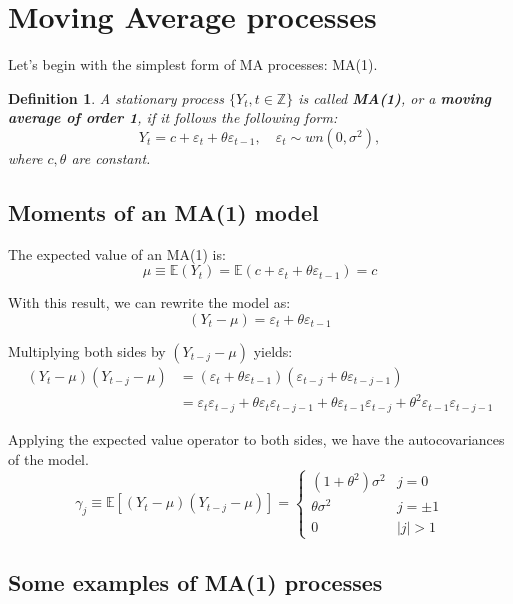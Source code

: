 \documentclass[11pt, a4paper]{report}
\theoremstyle{plain}
\theoremstyle{plain}
\newtheorem{defn}{Definition}[section]
\theoremstyle{remark}
\begin{document}
\section{Moving Average processes}

Let's begin with the simplest form of MA processes: MA(1). 
\begin{defn} \label{ma1-def}
	A stationary process $\{Y_t, t \in \mathbb{Z} \}$ is called \textbf{MA(1)}, or a \textbf{moving average of order 1}, if it follows the following form:
	$$ Y_t = c + \varepsilon_t + \theta \varepsilon_{t-1}, \hspace{1em} \varepsilon_t \sim wn(0, \sigma^2), $$
	where $c, \theta$ are constant.
\end{defn}

\subsection{Moments of an MA(1) model}

The expected value of an MA(1) is:
$$
\mu \equiv \mathbb{E}\left(Y_{t}\right)=\mathbb{E}\left(c+\varepsilon_{t}+\theta \varepsilon_{t-1}\right)=c
$$

With this result, we can rewrite the model as: 
$$
\left(Y_{t}-\mu\right)=\varepsilon_{t}+\theta \varepsilon_{t-1}
$$

Multiplying both sides by $\left(Y_{t-j}-\mu\right)$ yields:
$$
\begin{aligned}
	\left(Y_{t}-\mu\right)\left(Y_{t-j}-\mu\right) &=\left(\varepsilon_{t}+\theta \varepsilon_{t-1}\right)\left(\varepsilon_{t-j}+\theta \varepsilon_{t-j-1}\right) \\
	&=\varepsilon_{t} \varepsilon_{t-j}+\theta \varepsilon_{t} \varepsilon_{t-j-1}+\theta \varepsilon_{t-1} \varepsilon_{t-j}+\theta^{2} \varepsilon_{t-1} \varepsilon_{t-j-1}
\end{aligned}
$$

Applying the expected value operator to both sides, we have the autocovariances of the model.
$$
\gamma_{j} \equiv \mathbb{E}\left[\left(Y_{t}-\mu\right)\left(Y_{t-j}-\mu\right)\right]=\left\{\begin{array}{ll}
	\left(1+\theta^{2}\right) \sigma^{2} & j=0 \\
	\theta \sigma^{2} & j=\pm 1 \\
	0 & |j|>1
\end{array}\right.
$$

\subsection{Some examples of MA(1) processes}
\end{document}
